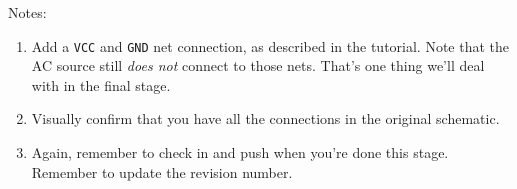 \documentclass[
  letterpaper,
  DIV=11,
  numbers=noendperiod,
  oneside]{scrartcl}
\begin{document}
Notes:

\begin{enumerate}
\def\labelenumi{\arabic{enumi}.}
\item
  Add a \texttt{VCC} and \texttt{GND} net connection, as described in
  the tutorial. Note that the AC source still \emph{does not} connect to
  those nets. That's one thing we'll deal with in the final stage.
\item
  Visually confirm that you have all the connections in the original
  schematic.
\item
  Again, remember to check in and push when you're done this stage.
  Remember to update the revision number.
\end{enumerate}
\end{document}
